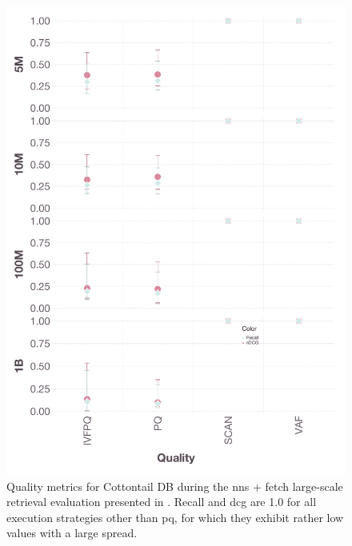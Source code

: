 \begin{figure}[bt]
    \includegraphics[width=\linewidth]{figures/bignns-cottontail-quality-NNS + Fetch}
    \caption{Quality metrics for Cottontail DB during the \acrshort{nns} + fetch large-scale retrieval evaluation presented in . Recall and \acrshort{dcg} are 1.0 for all execution strategies other than \acrshort{pq}, for which they exhibit rather low values with a large spread.}
    \label{figure:appendix_bignns_cottontail_nns_fetch_quality}
\end{figure}


